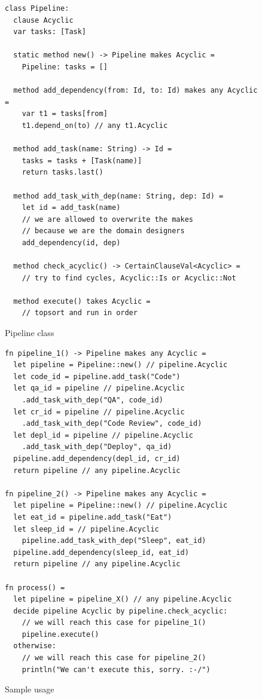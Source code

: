\documentclass[sigconf,screen,nonacm]{acmart}
\begin{document}
\begin{figure}[H]
\begin{verbatim}
class Pipeline:
  clause Acyclic
  var tasks: [Task]
  
  static method new() -> Pipeline makes Acyclic =
    Pipeline: tasks = []
  
  method add_dependency(from: Id, to: Id) makes any Acyclic =
    var t1 = tasks[from]
    t1.depend_on(to) // any t1.Acyclic
  
  method add_task(name: String) -> Id =
    tasks = tasks + [Task(name)]
    return tasks.last()
  
  method add_task_with_dep(name: String, dep: Id) =
    let id = add_task(name)
    // we are allowed to overwrite the makes
    // because we are the domain designers
    add_dependency(id, dep)
  
  method check_acyclic() -> CertainClauseVal<Acyclic> =
    // try to find cycles, Acyclic::Is or Acyclic::Not
  
  method execute() takes Acyclic =
    // topsort and run in order
\end{verbatim}
    \caption{Pipeline class}
    \label{fig:pipeline-class}
\end{figure}

\begin{figure}[H]
\begin{verbatim}
fn pipeline_1() -> Pipeline makes any Acyclic =
  let pipeline = Pipeline::new() // pipeline.Acyclic
  let code_id = pipeline.add_task("Code")
  let qa_id = pipeline // pipeline.Acyclic
    .add_task_with_dep("QA", code_id)
  let cr_id = pipeline // pipeline.Acyclic
    .add_task_with_dep("Code Review", code_id)
  let depl_id = pipeline // pipeline.Acyclic
    .add_task_with_dep("Deploy", qa_id)
  pipeline.add_dependency(depl_id, cr_id)
  return pipeline // any pipeline.Acyclic

fn pipeline_2() -> Pipeline makes any Acyclic =
  let pipeline = Pipeline::new() // pipeline.Acyclic
  let eat_id = pipeline.add_task("Eat")
  let sleep_id = // pipeline.Acyclic
    pipeline.add_task_with_dep("Sleep", eat_id)
  pipeline.add_dependency(sleep_id, eat_id)
  return pipeline // any pipeline.Acyclic

fn process() =
  let pipeline = pipeline_X() // any pipeline.Acyclic
  decide pipeline Acyclic by pipeline.check_acyclic:
    // we will reach this case for pipeline_1()
    pipeline.execute()
  otherwise:
    // we will reach this case for pipeline_2()
    println("We can't execute this, sorry. :-/")
\end{verbatim}
    \caption{Sample usage}
    \label{fig:sample-usage}
\end{figure}
\end{document}
